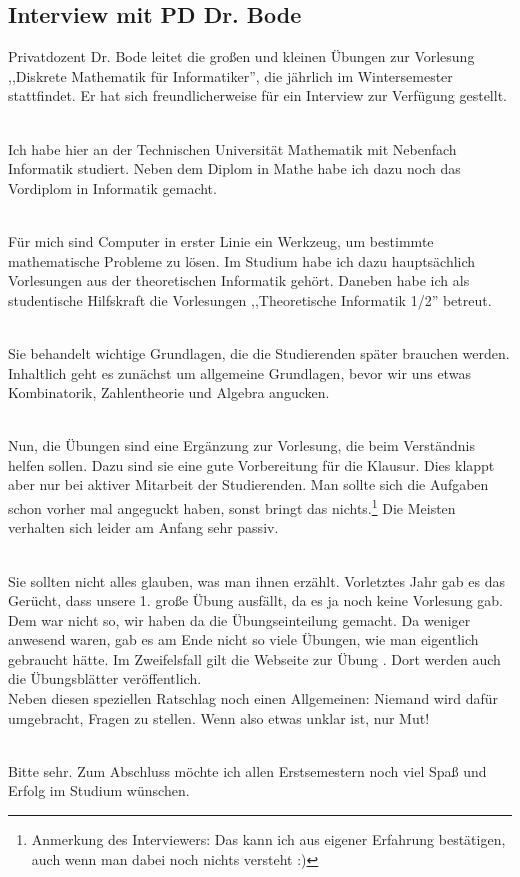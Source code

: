\subsection{Interview mit PD Dr. Bode}

Privatdozent Dr. Bode leitet die großen und kleinen Übungen zur
Vorlesung ,,Diskrete Mathematik für Informatiker'', die jährlich im
Wintersemester stattfindet.  Er hat sich
freundlicherweise für ein Interview zur Verfügung gestellt.

\\
Ich habe hier an der Technischen Universität Mathematik mit Nebenfach
Informatik studiert. Neben dem Diplom in Mathe habe ich dazu noch das
Vordiplom in Informatik gemacht.

\\
Für mich sind Computer in erster Linie ein Werkzeug, um bestimmte
mathematische Probleme zu lösen. Im Studium habe ich dazu
hauptsächlich Vorlesungen aus der theoretischen Informatik
gehört. Daneben habe ich als studentische Hilfskraft die Vorlesungen
,,Theoretische Informatik 1/2'' betreut.

\\
Sie behandelt wichtige Grundlagen, die die Studierenden später
brauchen werden. Inhaltlich geht es zunächst um allgemeine Grundlagen,
bevor wir uns etwas Kombinatorik, Zahlentheorie und Algebra angucken.

\\
Nun, die Übungen sind eine Ergänzung zur Vorlesung, die beim
Verständnis helfen sollen. Dazu sind sie eine gute Vorbereitung für
die Klausur. Dies klappt aber nur bei aktiver Mitarbeit der
Studierenden. Man sollte sich die Aufgaben schon vorher mal angeguckt
haben, sonst bringt das nichts.\footnote{Anmerkung des Interviewers:
Das kann ich aus eigener Erfahrung bestätigen, auch wenn man dabei
noch nichts versteht :)} Die Meisten verhalten sich leider am Anfang
sehr passiv.

\\
Sie sollten  nicht alles glauben, was man ihnen
erzählt. Vorletztes Jahr gab es das Gerücht, dass unsere 1. große Übung
ausfällt, da es ja noch keine Vorlesung gab. Dem war nicht so, wir
haben da die Übungseinteilung gemacht. Da weniger anwesend waren, gab
es am Ende nicht so viele Übungen, wie man eigentlich gebraucht
hätte. Im Zweifelsfall gilt die Webseite zur Übung
. Dort werden auch die
Übungsblätter veröffentlich.\\
Neben diesen speziellen Ratschlag noch einen Allgemeinen: Niemand wird
dafür umgebracht, Fragen zu stellen. Wenn also etwas unklar ist, nur Mut!

\\
Bitte sehr. Zum Abschluss möchte ich allen Erstsemestern noch viel
Spaß und Erfolg im Studium wünschen.
